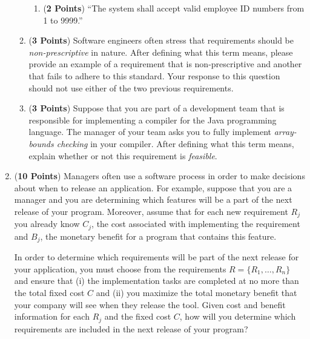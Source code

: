 \documentclass[12pt,epsf,psfig,graphics]{article}
\begin{document}
\begin{enumerate}
\begin{enumerate}
\begin{enumerate}
            \item ({\bf 2 Points}) ``The system shall accept valid
              employee ID numbers from 1 to 9999.''

          \end{enumerate}                    
          
	\item ({\bf 3 Points}) Software engineers often stress that requirements should be {\em non-prescriptive} in
	  nature.  After defining what this term means, please provide an example of a requirement that is
	  non-prescriptive and another that fails to adhere to this standard.  Your response to this question should not
	  use either of the two previous requirements.

        \item ({\bf 3 Points}) Suppose that you are part of a
          development team that is responsible for implementing a
          compiler for the Java programming language.  The manager of
          your team asks you to fully implement {\em array-bounds
            checking} in your compiler.  After defining what this term
          means, explain whether or not this requirement is {\em
            feasible}.

        \end{enumerate}

\newpage

\item ({\bf 10 Points}) Managers often use a software process in order
  to make decisions about when to release an application.  For
  example, suppose that you are a manager and you are determining
  which features will be a part of the next release of your program.
  Moreover, assume that for each new requirement $R_j$ you already
  know $C_j$, the cost associated with implementing the requirement
  and $B_j$, the monetary benefit for a program that contains this
  feature.

  In order to determine which requirements will be part of the next
  release for your application, you must choose from the requirements
  $R = \{ R_1, \ldots, R_n \}$ and ensure that (i) the implementation
  tasks are completed at no more than the total fixed cost $C$ and
  (ii) you maximize the total monetary benefit that your company will
  see when they release the tool.  Given cost and benefit information
  for each $R_j$ and the fixed cost $C$, how will you determine which
  requirements are included in the next release of your program?
    

\end{enumerate}
\end{document}

